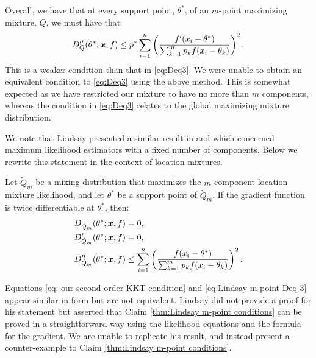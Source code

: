 	Overall, we have that at every support point, $\theta^*$, of an $m$-point maximizing mixture, $Q$, we must have that
	\begin{equation}
		D_Q''(\theta^*;{\bm{{x}}},f) \leq p^* \sum_{i = 1}^n \left(\frac{f'(x_i - \theta^*)}{\sum_{k = 1}^m p_k f(x_i - \theta_k)}\right)^2.
		\label{eq: our second order KKT condition}
	\end{equation}
	This is a weaker condition than that in \eqref{eq:Deq3}. We were unable to obtain an equivalent condition to \eqref{eq:Deq3} using the above method. This is somewhat expected as we have restricted our mixture to have no more than $m$ components, whereas the condition in \eqref{eq:Deq3} relates to the global maximizing mixture distribution.

	We note that Lindsay presented a similar result in \cite[Theorem 7.1]{Lindsay1983-tf} and \cite[Theorem 24]{Lindsay1995-sq} which concerned maximum likelihood estimators with a fixed number of components. Below we rewrite this statement in the context of location mixtures.
	\begin{claim}
	\label{thm:Lindsay m-point conditions}
		Let $\tilde{Q}_m$ be a mixing distribution that maximizes the $m$ component location mixture likelihood, and let $\theta^*$ be a support point of $\tilde{Q}_m$. If the gradient function is twice differentiable at $\theta^*$, then:
		\begin{align}
			D_{\tilde{Q}_m}(\theta^*; {\bm{{x}}}, f) &= 0,\\
			D_{\tilde{Q}_m}'(\theta^*; {\bm{{x}}}, f) &= 0,\\
			D_{\tilde{Q}_m}''(\theta^*; {\bm{{x}}}, f) &\leq \sum_{i = 1}^n \left(\frac{f(x_i - \theta^*)}{\sum_{k = 1}^m p_k f(x_i - \theta_k)}\right)^2.
			\label{eq:Lindsay m-point Deq 3}
		\end{align}
	\end{claim}

	Equations \eqref{eq: our second order KKT condition} and \eqref{eq:Lindsay m-point Deq 3} appear similar in form but are not equivalent. Lindsay did not provide a proof for his statement but asserted that Claim \ref{thm:Lindsay m-point conditions} can be proved in a straightforward way using the likelihood equations and the formula for the gradient. We are unable to replicate his result, and instead present a counter-example to Claim \ref{thm:Lindsay m-point conditions}.

